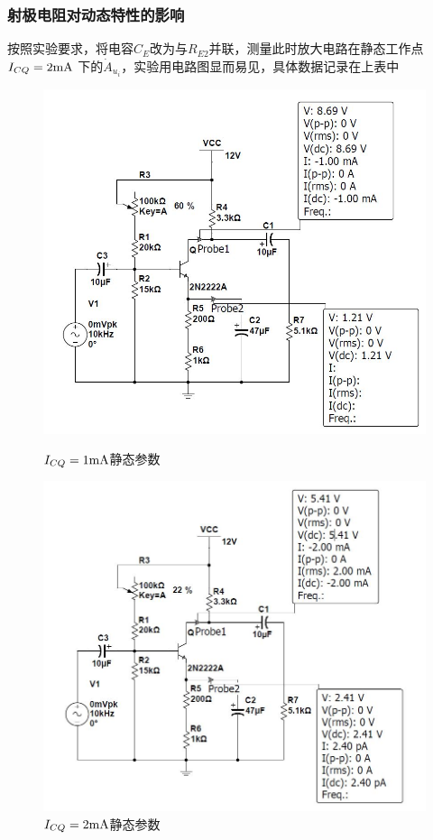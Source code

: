 \documentclass[UTF8,a4paper]{ctexart}
\begin{document}
\subsubsection{射极电阻对动态特性的影响}
按照实验要求，将电容$C_E$改为与$R_{E2}$并联，测量此时放大电路在静态工作点$I_{CQ}=2\rm{mA}$ 下的$\dot{A}_{u_i}$，实验用电路图显而易见，具体数据记录在上表中
\begin{figure}
\centering
\includegraphics[width=\textwidth]{1.jpg}
\caption{$I_{CQ}=1\rm{mA}$静态参数}
\label{1}
\includegraphics[width=\textwidth]{2.jpg}
\caption{$I_{CQ}=2\rm{mA}$静态参数}
\label{2}
\end{figure}
\end{document}

